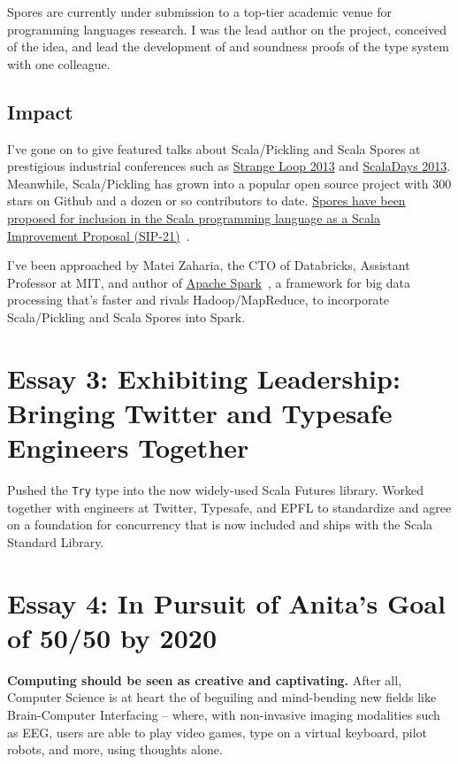 \documentclass[acmtocl]{acmtrans2m}
\begin{document}
Spores are currently under submission to a top-tier academic venue for
programming languages research. I was the lead author on the project,
conceived of the idea, and lead the development of and soundness proofs of
the type system with one colleague.


\vspace{-0.2in}
\subsection*{\textbf{Impact}}
\vspace{-0.1in}

I've gone on to give featured talks about Scala/Pickling and Scala Spores at
prestigious industrial conferences such as
\href{http://www.infoq.com/presentations/scala-pickles-spores}{Strange Loop
2013} and \href{http://parleys.com/play/51c3799fe4b0d38b54f4625a}{ScalaDays
2013}. Meanwhile, Scala/Pickling has grown into a popular open source project
with 300 stars on Github and a dozen or so contributors to date.
\href{http://docs.scala-lang.org/sips/pending/spores.html}{Spores have been
proposed for inclusion in the Scala programming language as a Scala
Improvement Proposal (SIP-21)}~\cite{Spores}.

I've been approached by Matei Zaharia, the CTO of Databricks, Assistant
Professor at MIT, and author of
\href{https://spark.incubator.apache.org/}{Apache Spark}~\cite{Spark}, a
framework for big data processing that's faster and rivals Hadoop/MapReduce,
to incorporate Scala/Pickling and Scala Spores into Spark.


\section*{\textbf{Essay 3:} Exhibiting Leadership: Bringing Twitter and Typesafe Engineers Together}

Pushed the \verb|Try| type into the now widely-used Scala Futures library.
Worked together with engineers at Twitter, Typesafe, and EPFL to standardize
and agree on a foundation for concurrency that is now included and ships with
the Scala Standard Library.

\section*{\textbf{Essay 4:} In Pursuit of Anita's Goal of 50/50 by 2020}

\textbf{Computing should be seen as creative and captivating.}
After all, Computer Science is at heart the of beguiling and mind-bending new
fields like {Brain-Computer} Interfacing -- where, with non-invasive imaging
modalities such as EEG, users are able to play video games, type on a virtual
keyboard, pilot robots, and more, using thoughts alone.
\end{document}
